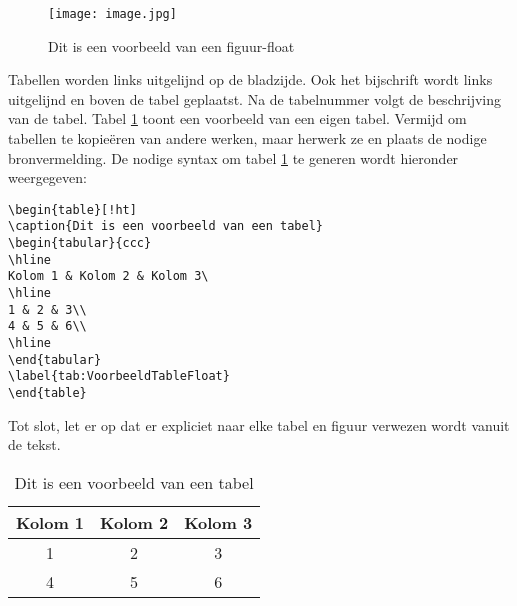  
 \begin{figure}[!ht]
 	\centering
 	\texttt{[image: image.jpg]}
 	\caption{Dit is een voorbeeld van een figuur-float}
 	\label{fig:VoorbeeldFigFloat}
 \end{figure}

Tabellen worden links uitgelijnd op de bladzijde. Ook het bijschrift wordt links uitgelijnd en boven de tabel geplaatst. Na de tabelnummer volgt de beschrijving van de tabel. Tabel \ref{tab:VoorbeeldTableFloat} toont een voorbeeld van een eigen tabel. Vermijd om tabellen te kopie\"eren van andere werken, maar herwerk ze en plaats de nodige bronvermelding. De nodige syntax om tabel \ref{tab:VoorbeeldTableFloat} te generen wordt hieronder weergegeven:

\verb|\begin{table}[!ht]|\\
\verb|\caption{Dit is een voorbeeld van een tabel}|\\
\verb|\begin{tabular}{ccc}|\\
\verb|\hline|\\
\verb|Kolom 1 & Kolom 2 & Kolom 3\|\\
\verb|\hline|\\
\verb|1 & 2 & 3\\|\\
\verb|4 & 5 & 6\\|\\
\verb|\hline|\\
\verb|\end{tabular}|\\
\verb|\label{tab:VoorbeeldTableFloat}|\\
\verb|\end{table}|

Tot slot, let er op dat er expliciet naar elke tabel en figuur verwezen wordt vanuit de tekst. 

\begin{table}[!ht]
		\caption{Dit is een voorbeeld van een tabel}
		
	\begin{tabular}{ccc}
		\hline
		Kolom 1 & Kolom 2 & Kolom 3\\
		\hline
		1 & 2 & 3\\
		4 & 5 & 6\\
		\hline
	\end{tabular}
\label{tab:VoorbeeldTableFloat}
\end{table}